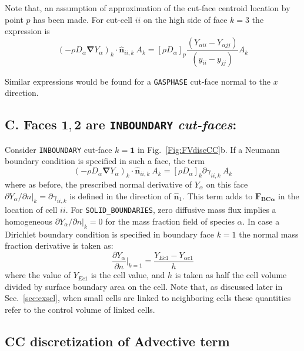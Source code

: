 %
Note that, an assumption of approximation of the cut-face centroid location by point $p$ has been made. For cut-cell $ii$ on the high side of face $k=3$ the expression is
%
\begin{equation}
  \left( - \rho D_\alpha \boldsymbol{\nabla} Y_\alpha \right)_k \cdot \hat{\mathbf{n}}_{ii,k} \: A_k =
  [ \rho D_\alpha ]_p \frac{\left(  Y_{\alpha ii} - Y_{\alpha jj} \right)}{(y_{ii}-y_{jj})}A_k
\end{equation}
%

Similar expressions would be found for a \texttt{GASPHASE} cut-face normal to the $x$ direction. 


\subsection*{C. Faces $\mathbf{1},\mathbf{2}$ are \texttt{INBOUNDARY} \textit{cut-faces}:}

Consider \texttt{INBOUNDARY} cut-face $k=\mathbf{1}$ in Fig.~\ref{Fig:FVdiscCC}b. If a Neumann boundary condition is specified in such a face, the term
%
\begin{equation}
  \left( - \rho D_\alpha \boldsymbol{\nabla} Y_\alpha \right)_k \cdot \hat{\mathbf{n}}_{ii,k} \: A_k = [\rho D_\alpha]_k \partial \gamma_{ii,k} \: A_k
\end{equation}
%
where as before, the prescribed normal derivative of $Y_\alpha$ on this face $\partial Y_\alpha / \partial n |_k=\partial  \gamma_{ii,k}$ is defined in the direction of $\hat{\mathbf{n}}_1$.
This term adds to $\mathbf{F_{BC \alpha}}$ in the location of cell $ii$. For \texttt{SOLID\_BOUNDARIES}, zero diffusive mass flux implies a homogeneous $\partial Y_\alpha / \partial n |_k=0$ for the mass fraction field of species $\alpha$.
In case a Dirichlet boundary condition is specified in boundary face $k=1$ the normal mass fraction derivative is taken as:
%
\begin{equation}
   \frac{\partial Y_\alpha}{\partial n} |_{k=1}=\frac{Y_{Ec1} - Y_{\alpha c1}}{h} 
\end{equation}
%
where the value of $Y_{Ec1}$ is the cell value, and $h$ is taken as half the cell volume divided by surface boundary area on the cell. Note that, as discussed later in Sec.~\ref{sec:exscl}, when small cells are linked to neighboring cells these quantities refer to the control volume of linked cells.


\subsection{CC discretization of Advective term}

